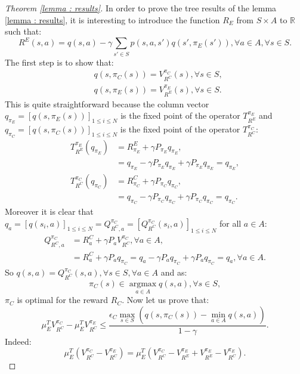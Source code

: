 \documentclass{article} %
\newcommand{\argmax}{\operatorname*{argmax}}
\newcommand{\0}{\mathbf{0}}
\newcommand{\1}{\mathbf{1}}
\begin{document}
\begin{proof}[Theorem \ref{lemma : results}]
In order to prove the tree results of the lemma \ref{lemma : results}, it is interesting to introduce the function $R_E$ from $S\times A$ to $\mathbb{R}$ such that:
\begin{equation}
R^E(s,a)=q(s,a)-\gamma\sum_{s'\in S}p(s,a,s')q(s',\pi_E(s')), \forall a \in A, \forall s\in S.
\end{equation}
The first step is to show that:
\begin{align}
&q(s,\pi_C(s))=V^{\pi_C}_{R^C}(s), \forall s\in S,
\\
&q(s,\pi_E(s))=V^{\pi_E}_{R^E}(s), \forall s\in S.
\end{align}
This is quite straightforward because the column vector $q_{\pi_E}=[q(s,\pi_E(s))]_{1\leq i\leq N}$ is the fixed point of the operator $T^{\pi_E}_{R^E}$ and  $q_{\pi_C}=[q(s,\pi_C(s))]_{1\leq i\leq N}$ is the fixed point of the operator $T^{\pi_C}_{R^C}$:
\begin{align}
T^{\pi_E}_{R^E}(q_{\pi_E})&=R^E_{\pi_E}+\gamma P_{\pi_E}q_{\pi_E},
\\
&=q_{\pi_E}-\gamma P_{\pi_E}q_{\pi_E}+\gamma P_{\pi_E}q_{\pi_E}=q_{\pi_E},
\\
T^{\pi_C}_{R^C}(q_{\pi_C})&=R^C_{\pi_C}+\gamma P_{\pi_C}q_{\pi_C},
\\
&=q_{\pi_C}-\gamma P_{\pi_C}q_{\pi_C}+\gamma P_{\pi_C}q_{\pi_C}=q_{\pi_C}.
\end{align}
Moreover it is clear that $q_a=[q(s_i,a)]_{1\leq i\leq N}=Q^{\pi_C}_{R^C,a}=[Q^{\pi_C}_{R^C}(s_i,a)]_{1\leq i\leq N}$ for all $a \in A$:
\begin{align}
Q^{\pi_C}_{R^C,a}&=R^C_a+\gamma P_a V^{\pi_C}_{R^C}, \forall a\in A,
\\
&=R^C_a+\gamma P_a q_{\pi_C}=q_a-\gamma P_a q_{\pi_C} + \gamma P_a q_{\pi_C}=q_a, \forall a\in A.
\end{align}
So $q(s,a)=Q^{\pi_C}_{R^C}(s,a),\forall s\in S,\forall a\in A$ and as:
\begin{equation}
\pi_C(s)\in\argmax_{a\in A}q(s,a), \forall s\in S,
\end{equation}
$\pi_C$ is optimal for the reward $R_C$.
Now let us prove that:
\begin{equation}
\mu_E^TV^{\pi_C}_{R^C}-\mu_E^TV^{\pi_E}_{R^C}\leq\frac{\epsilon_C\max_{s\in S}(q(s,\pi_C(s))-\min_{a\in A}q(s,a))}{1-\gamma}.
\end{equation}
Indeed:
\begin{equation}
\mu_E^T(V^{\pi_C}_{R^C}-V^{\pi_E}_{R^C})=\mu_E^T(V^{\pi_C}_{R^C}-V^{\pi_E}_{R^E}+V^{\pi_E}_{R^E}-V^{\pi_E}_{R^C}).

\end{equation}
\end{proof}
\end{document}
